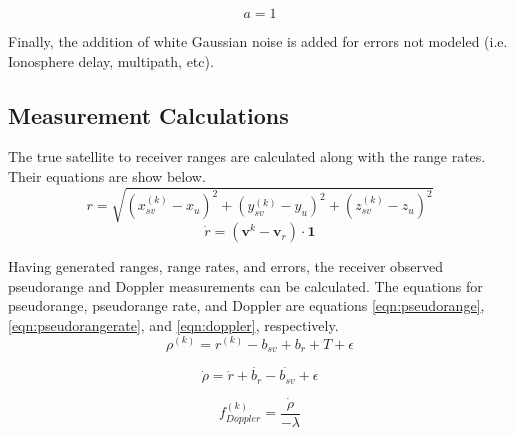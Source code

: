 \documentclass[12pt]{report}
\begin{document}
\begin{equation}
    a = 1
\end{equation}
    
Finally, the addition of white Gaussian noise is added for errors not modeled (i.e. Ionosphere delay, multipath, etc). 

\subsection{Measurement Calculations}
The true satellite to receiver ranges are calculated along with the range rates. Their equations are show below.
\begin{equation}
    r = \sqrt{(x^{(k)}_{sv} - x_u)^2 + (y^{(k)}_{sv} - y_u)^2 + (z^{(k)}_{sv} - z_u)^2}
    \label{eqn:rangeeqn}
\end{equation}
\begin{equation}
    \dot{r} = (\mathbf{v}^{k} - \mathbf{v}_r) \cdot \mathbf{1}
    \label{eqn:rangerate}
\end{equation}

Having generated ranges, range rates, and errors, the receiver observed pseudorange and Doppler measurements can be calculated. The equations for pseudorange, pseudorange rate, and Doppler are equations \ref{eqn:pseudorange}, \ref{eqn:pseudorangerate}, and \ref{eqn:doppler}, respectively.
\begin{equation}
    \rho^{(k)} = r^{(k)} - b_{sv} + b_r + T +\epsilon
    \label{eqn:pseudorange}
\end{equation}

\begin{equation}
    \dot{\rho} = \dot{r} + \dot{b_r} - \dot{b_{sv}} + \epsilon
    \label{eqn:pseudorangerate}
\end{equation}

\begin{equation}
    f^{(k)}_{Doppler} = \frac{\dot{\rho}}{-\lambda}
    \label{eqn:doppler}
\end{equation}
\end{document}
